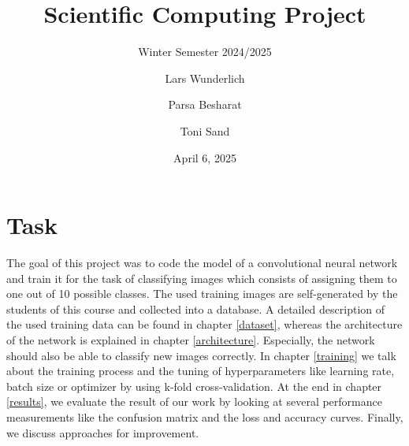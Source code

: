 \documentclass{tubaf-article}
\begin{document}
	\title{Scientific Computing Project}
	\subtitle{Winter Semester 2024/2025}
	\author{Lars Wunderlich \and Parsa Besharat \and Toni Sand}
	\date{April 6, 2025}
	\subject{Documentation}
	\publishers{TU Bergakademie Freiberg}
	
	\maketitle
	
	\tableofcontents
	
	\newpage
	
	\section{Task}
	
	The goal of this project was to code the model of a convolutional neural network and train it for the task of classifying images which consists of assigning them to one out of 10 possible classes. The used training images are self-generated by the students of this course and collected into a database. A detailed description of the used training data can be found in chapter \ref{dataset}, whereas the architecture of the network is explained in chapter \ref{architecture}. Especially, the network should also be able to classify new images correctly. In chapter \ref{training} we talk about the training process and the tuning of hyperparameters like learning rate, batch size or optimizer by using k-fold cross-validation. At the end in chapter \ref{results}, we evaluate the result of our work by looking at several performance measurements like the confusion matrix and the loss and accuracy curves. Finally, we discuss approaches for improvement.
	
\end{document}
